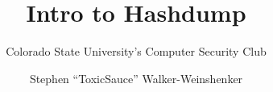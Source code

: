 
\title{Intro to Hashdump}
\subtitle{Colorado State University's Computer Security Club}
\author{Stephen ``ToxicSauce'' Walker-Weinshenker}



